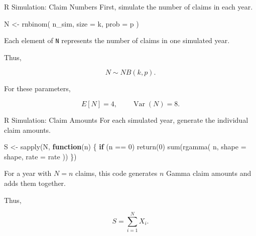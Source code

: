 \documentclass[
  ignorenonframetext,
  aspectratio=169,
]{beamer}
\newenvironment{Shaded}{\begin{snugshade}}{\end{snugshade}}
\newcommand{\AttributeTok}[1]{\textcolor[rgb]{0.40,0.45,0.13}{#1}}
\newcommand{\ControlFlowTok}[1]{\textcolor[rgb]{0.00,0.23,0.31}{\textbf{#1}}}
\newcommand{\DecValTok}[1]{\textcolor[rgb]{0.68,0.00,0.00}{#1}}
\newcommand{\FunctionTok}[1]{\textcolor[rgb]{0.28,0.35,0.67}{#1}}
\newcommand{\NormalTok}[1]{\textcolor[rgb]{0.00,0.23,0.31}{#1}}
\newcommand{\OtherTok}[1]{\textcolor[rgb]{0.00,0.23,0.31}{#1}}
\newcommand{\SpecialCharTok}[1]{\textcolor[rgb]{0.37,0.37,0.37}{#1}}
\begin{document}
\begin{frame}[fragile]{R Simulation: Claim Numbers}
\protect{}\label{r-simulation-claim-numbers}
First, simulate the number of claims in each year.

\begin{Shaded}
\begin{Highlighting}[]
\NormalTok{N }\OtherTok{\textless{}{-}} \FunctionTok{rnbinom}\NormalTok{(}
\NormalTok{  n\_sim,}
  \AttributeTok{size =}\NormalTok{ k,}
  \AttributeTok{prob =}\NormalTok{ p}
\NormalTok{)}
\end{Highlighting}
\end{Shaded}

Each element of \texttt{N} represents the number of claims in one
simulated year.

Thus,

\[
N\sim NB(k,p).
\]

For these parameters,

\[
E[N]=4,\qquad \operatorname{Var}(N)=8.
\]
\end{frame}

\begin{frame}[fragile]{R Simulation: Claim Amounts}
\protect{}\label{r-simulation-claim-amounts}
For each simulated year, generate the individual claim amounts.

\begin{Shaded}
\begin{Highlighting}[]
\NormalTok{S }\OtherTok{\textless{}{-}} \FunctionTok{sapply}\NormalTok{(N, }\ControlFlowTok{function}\NormalTok{(n) \{}
  \ControlFlowTok{if}\NormalTok{ (n }\SpecialCharTok{==} \DecValTok{0}\NormalTok{) }\FunctionTok{return}\NormalTok{(}\DecValTok{0}\NormalTok{)}
  \FunctionTok{sum}\NormalTok{(}\FunctionTok{rgamma}\NormalTok{(}
\NormalTok{    n, }\AttributeTok{shape =}\NormalTok{ shape, }\AttributeTok{rate =}\NormalTok{ rate}
\NormalTok{  ))}
\NormalTok{\})}
\end{Highlighting}
\end{Shaded}

For a year with \(N=n\) claims, this code generates \(n\) Gamma claim
amounts and adds them together.

Thus,

\[
S=\sum_{i=1}^{N}X_i.
\]
\end{frame}
\end{document}
